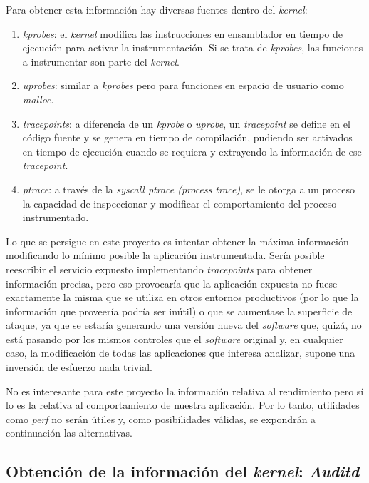 Para obtener esta información hay diversas fuentes dentro del \emph{kernel}:

\begin{enumerate}
    \item \emph{kprobes}: el \emph{kernel} modifica las instrucciones en ensamblador en tiempo de ejecución para activar la instrumentación. Si se trata
    de \emph{kprobes}, las funciones a instrumentar son parte del \emph{kernel}. 
    \item \emph{uprobes}: similar a \emph{kprobes} pero para funciones en espacio de usuario como \emph{malloc}.
    \item \emph{tracepoints}: a diferencia de un \emph{kprobe} o \emph{uprobe}, un \emph{tracepoint} se define en el código fuente y se genera en tiempo de compilación, pudiendo ser activados en tiempo de ejecución cuando se requiera y extrayendo la información de ese \emph{tracepoint}.
    \item \emph{ptrace}: a través de la \emph{syscall ptrace (process trace)}, se le otorga a un proceso la capacidad de inspeccionar y modificar el comportamiento del proceso instrumentado. 
\end{enumerate}

Lo que se persigue en este proyecto es intentar obtener la máxima información modificando lo mínimo posible la aplicación instrumentada. Sería posible
reescribir el servicio expuesto implementando \emph{tracepoints} para obtener información precisa, pero eso provocaría que la aplicación expuesta no fuese exactamente la misma que se utiliza
en otros entornos productivos (por lo que la información que proveería podría ser inútil) o que se aumentase la superficie de ataque, ya que se estaría
generando una versión nueva del \emph{software} que, quizá, no está pasando por los mismos controles que el \emph{software} original y, en cualquier caso, la modificación de todas las aplicaciones
que interesa analizar, supone una inversión de esfuerzo nada trivial.

No es interesante para este proyecto la información relativa al rendimiento pero sí lo es la relativa al comportamiento de nuestra aplicación. Por lo tanto,
utilidades como \emph{perf} no serán útiles y, como posibilidades válidas, se expondrán a continuación las alternativas.

\subsection{Obtención de la información del \emph{kernel}: \emph{Auditd}}
\label{subsec:auditd}

